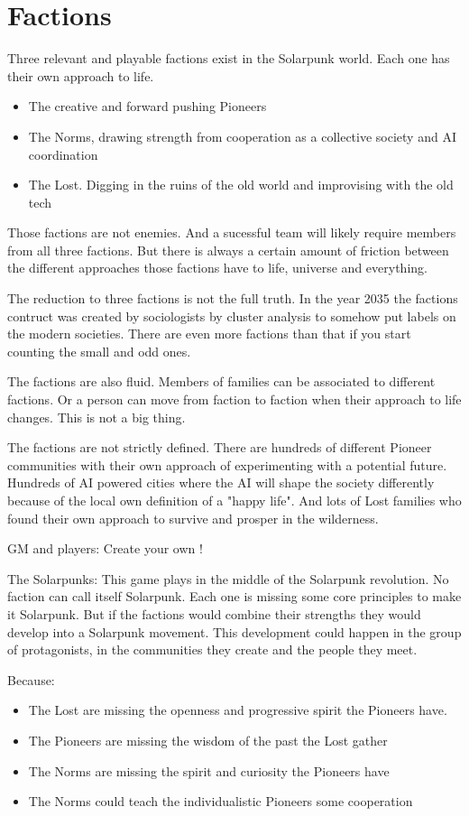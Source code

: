 \chapter{Factions}

Three relevant and playable factions exist in the Solarpunk world. Each one has their own approach to life.

\begin{itemize}
    \item The creative and forward pushing Pioneers
    \item The Norms, drawing strength from cooperation as a collective society and AI coordination
    \item The Lost. Digging in the ruins of the old world and improvising with the old tech
\end{itemize}

Those factions are not enemies. And a sucessful team will likely require members from all three factions. But there is always a certain amount of friction between the different approaches those factions have to life, universe and everything.

The reduction to three factions is not the full truth. In the year 2035 the factions contruct was created by sociologists by cluster analysis to somehow put labels on the modern societies. There are even more factions than that if you start counting the small and odd ones.

The factions are also fluid. Members of families can be associated to different factions. Or a person can move from faction to faction when their approach to life changes. This is not a big thing.

The factions are not strictly defined. There are hundreds of different Pioneer communities with their own approach of experimenting with a potential future. Hundreds of AI powered cities where the AI will shape the society differently because of the local own definition of a "happy life". And lots of Lost families who found their own approach to survive and prosper in the wilderness.

GM and players: Create your own !

The Solarpunks: This game plays in the middle of the Solarpunk revolution. No faction can call itself Solarpunk. Each one is missing some core principles to make it Solarpunk. But if the factions would combine their strengths they would develop into a Solarpunk movement. This development could happen in the group of protagonists, in the communities they create and the people they meet.

Because:

\begin{itemize}
\item The Lost are missing the openness and progressive spirit the Pioneers have.
\item The Pioneers are missing the wisdom of the past the Lost gather
\item The Norms are missing the spirit and curiosity the Pioneers have
\item The Norms could teach the individualistic Pioneers some cooperation
\end{itemize}
